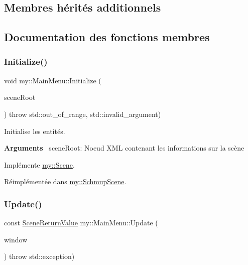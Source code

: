\subsection*{Membres hérités additionnels}


\subsection{Documentation des fonctions membres}
\mbox{\label{classmy_1_1MainMenu_a56e81061a8d8d9a0da77267bd38ec058}} 
\subsubsection{\texorpdfstring{Initialize()}{Initialize()}}
{\footnotesize\ttfamily void my\+::\+Main\+Menu\+::\+Initialize (\begin{DoxyParamCaption}\item[{X\+M\+L\+Node\+::\+X\+M\+L\+Node\+Ptr}]{scene\+Root }\end{DoxyParamCaption}) throw  std\+::out\+\_\+of\+\_\+range, std\+::invalid\+\_\+argument) \hspace{0.3cm}{\ttfamily [virtual]}}



Initialise les entités. 

{\bfseries Arguments}~\newline
 scene\+Root\+: Noeud X\+ML contenant les informations sur la scène 

Implémente \hyperlink{classmy_1_1Scene_ac9401c5ec0e8a740fa338324a7df67a6}{my\+::\+Scene}.



Réimplémentée dans \hyperlink{classmy_1_1SchmupScene_ad1febbc7aaf1fc8b2eb4d02cdbf3f57a}{my\+::\+Schmup\+Scene}.

\mbox{\label{classmy_1_1MainMenu_ada39ad2f51014f08e4526056967daf47}} 
\subsubsection{\texorpdfstring{Update()}{Update()}}
{\footnotesize\ttfamily const \hyperlink{structmy_1_1SceneReturnValue}{Scene\+Return\+Value} my\+::\+Main\+Menu\+::\+Update (\begin{DoxyParamCaption}\item[{sf\+::\+Render\+Window \&}]{window }\end{DoxyParamCaption}) throw  std\+::exception) \hspace{0.3cm}{\ttfamily [virtual]}}



